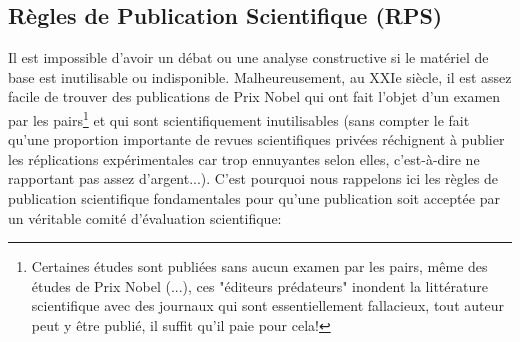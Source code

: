 	\pagebreak
	\subsection{Règles de Publication Scientifique (RPS)}
	Il est impossible d'avoir un débat ou une analyse constructive si le matériel de base est inutilisable ou indisponible. Malheureusement, au XXIe siècle, il est assez facile de trouver des publications de Prix Nobel qui ont fait l'objet d'un examen par les pairs\footnote{Certaines études sont publiées sans aucun examen par les pairs, même des études de Prix Nobel (...), ces "éditeurs prédateurs" inondent la littérature scientifique avec des journaux qui sont essentiellement fallacieux, tout auteur peut y être publié, il suffit qu'il paie pour cela!} et qui sont scientifiquement inutilisables (sans compter le fait qu'une proportion importante de revues scientifiques privées réchignent à publier les réplications expérimentales car trop ennuyantes selon elles, c'est-à-dire ne rapportant pas assez d'argent...). C'est pourquoi nous rappelons ici les règles de publication scientifique fondamentales pour qu'une publication soit acceptée par un véritable comité d'évaluation scientifique:
